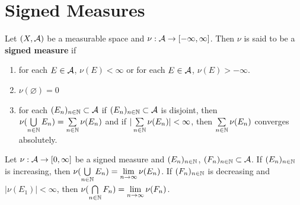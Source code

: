 \documentclass{book}
\begin{document}
	
	
	
	
	
	
	
	
	
	
	
	\newpage
	\section{Signed Measures}
	
	\begin{defn}  
		Let $(X, \mathcal{A})$ be a measurable space and $\nu : \mathcal{A} \rightarrow [-\infty, \infty]$. Then $\nu$ is said to be a \textbf{signed measure} if 
		\begin{enumerate}
			\item for each $E \in \mathcal{A}$, $\nu(E) < \infty$ or for each $E \in \mathcal{A}$, $\nu(E) > -\infty$.
			\item $\nu(\varnothing) = 0$
			\item for each $(E_n)_{n \in \mathbb{N}} \subset \mathcal{A}$ if $(E_n)_{n \in \mathbb{N}} \subset \mathcal{A}$ is disjoint, then $\nu(\bigcup\limits_{n \in \mathbb{N}} E_n) = \sum\limits_{n \in \mathbb{N}} \nu(E_n)$ and if $|\sum\limits_{n \in \mathbb{N}} \nu(E_n)| < \infty$, then $\sum\limits_{n \in \mathbb{N}} \nu(E_n)$ converges absolutely.
		\end{enumerate}
	\end{defn}
	
	\begin{ex}  
		Let $\nu: \mathcal{A} \rightarrow [0,\infty]$ be a signed measure and $(E_n)_{n \in \mathbb{N}}$, $(F_n)_{n \in \mathbb{N}} \subset \mathcal{A}$. If $(E_n)_{n \in \mathbb{N}}$ is increasing, then $\nu(\bigcup\limits_{n \in \mathbb{N}} E_n) = \lim \limits_{n \rightarrow \infty} \nu(E_n)$. If $(F_n)_{n \in \mathbb{N}}$ is decreasing and $|\nu(E_1)| < \infty$, then $\nu(\bigcap\limits_{n \in \mathbb{N}} F_n) = \lim \limits_{n \rightarrow \infty} \nu(F_n)$. 
	\end{ex}
	
\end{document}
